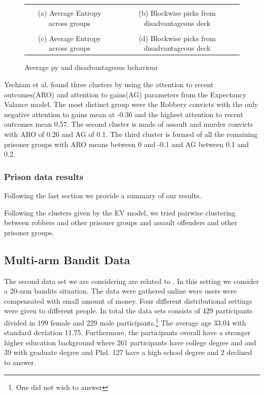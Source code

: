 \documentclass[12pt,a4paper,bibliography=totocnumbered,listof=totocnumbered]{scrartcl}
\begin{document}
\setlength{\tabcolsep}{-0.2cm}
\renewcommand{\arraystretch}{-0.6}
\begin{figure}[!htbp]
	\small
	\begin{tabular}{cc}
	 &  \\
	(a) Average Entropy across groups & (b) Blockwise picks from disadvantageous deck \\
	 &  \\
	(c) Average Entropy across groups & (d) Blockwise picks from disadvantageous deck 
	\end{tabular}
	\caption{Average py and disadvantageous behaviour}
	\label{fig:ent}
\end{figure}

Yechiam et al. found three clusters by using the attention to recent outcomes(ARO) and attention to gains(AG) parameters from the Expectancy Valance model. The most distinct group were the Robbery convicts with the only negative attention to gains mean at -0.36 and the highest attention to recent outcomes mean 0.57. The second cluster is made of assault and murder convicts with ARO of 0.26 and AG of 0.1. The third cluster is formed of all the remaining prisoner groups with ARO means between 0 and -0.1 and AG between 0.1 and 0.2.

\subsubsection{Prison data results}

Following the last section we provide a summary of our results. 

Following the clusters given by the EV model, we tried pairwise clustering between robbers and other prisoner groups and assault offenders and other prisoner groups.

\subsection{Multi-arm Bandit Data}

The second data set we are considering are related to \cite{Stojic2015}. In this setting we consider a 20-arm bandits situation. The data were gathered online were users were compensated with small amount of money. Four different distributional settings were given to different people. In total the data sets consists of 429 participants divided in 199 female and 229 male participants.\footnote{One did not wish to answer} The average age 33.04 with standard deviation 11.75. Furthermore, the participants overall have a stronger higher education background where 261 participants have college degree and and 39 with graduate degree and Phd. 127 have a high school degree and 2 declined to answer.
\end{document}
